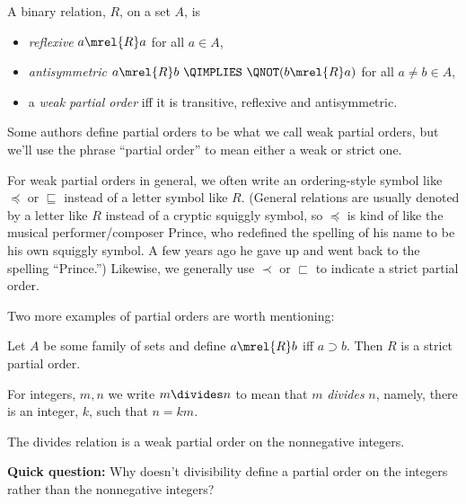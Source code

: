 \begin{definition}
A binary relation, $R$, on a set $A$, is
\begin{itemize}

\item \emph{reflexive} \qiff $a \mrel{R}  a$ \quad for all $a \in A$,

\item \emph{antisymmetric}\label{antis} \qiff
$a \mrel{R}  b\ \QIMPLIES\ \QNOT(b \mrel{R}  a)$
\quad for all $a \neq b \in A$,

\item a \emph{weak partial order} iff it is transitive, reflexive and
antisymmetric.

\end{itemize}
\end{definition}
%
Some authors define partial orders to be what we call weak partial orders,
but we'll use the phrase ``partial order'' to mean either a weak or strict
one.

For weak partial orders in general, we often write an ordering-style
symbol like $\preceq$ or $\sqsubseteq$ instead of a letter symbol like
$R$.  (General relations are usually denoted by a letter like $R$ instead
of a cryptic squiggly symbol, so $\preceq$ is kind of like the musical
performer/composer Prince, who redefined the spelling of his name to be
his own squiggly symbol.  A few years ago he gave up and went back to the
spelling ``Prince.'')  Likewise, we generally use $\prec$ or $\sqsubset$ to
indicate a strict partial order.  \iffalse We also write $b \succeq a$ to
mean $a \preceq b$ and $b \succ a$ to mean $a \prec b$.\fi

Two more examples of partial orders are worth mentioning:

\begin{example}\label{supset}
Let $A$ be some family of sets and define $a \mrel{R} b$ iff $a
\supset b$.  Then $R$ is a strict partial order.
\end{example}

For integers, $m,n$ we write $m \divides n$ to mean that $m$
\emph{divides} $n$, namely, there is an integer, $k$, such that $n=km$.

\begin{example}\label{divides}
The divides relation is a weak partial order on the nonnegative integers.
\end{example}

\textbf{Quick question:}  Why doesn't divisibility define a partial order
on the integers rather than the nonnegative integers?
\medskip

